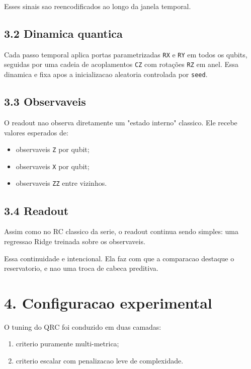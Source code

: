 \documentclass[12pt]{article}
\providecommand{\tightlist}{%
  \setlength{\itemsep}{0pt}\setlength{\parskip}{0pt}}
\begin{document}
Esses sinais sao reencodificados ao longo da janela temporal.

\subsection{3.2 Dinamica quantica}\label{32-dinamica-quantica}

Cada passo temporal aplica portas parametrizadas \texttt{RX} e \texttt{RY} em todos os qubits, seguidas por uma cadeia de acoplamentos \texttt{CZ} com rotações \texttt{RZ} em anel. Essa dinamica e fixa apos a inicializacao aleatoria controlada por \texttt{seed}.

\subsection{3.3 Observaveis}\label{33-observaveis}

O readout nao observa diretamente um "estado interno" classico. Ele recebe valores esperados de:

\begin{itemize}
\tightlist
\item
  observaveis \texttt{Z} por qubit;
\item
  observaveis \texttt{X} por qubit;
\item
  observaveis \texttt{ZZ} entre vizinhos.
\end{itemize}

\subsection{3.4 Readout}\label{34-readout}

Assim como no RC classico da serie, o readout continua sendo simples: uma regressao Ridge treinada sobre os observaveis.

Essa continuidade e intencional. Ela faz com que a comparacao destaque o reservatorio, e nao uma troca de cabeca preditiva.

\section{4. Configuracao experimental}\label{4-configuracao-experimental}

O tuning do QRC foi conduzido em duas camadas:

\begin{enumerate}
\def\labelenumi{\arabic{enumi}.}
\tightlist
\item
  criterio puramente multi-metrica;
\item
  criterio escalar com penalizacao leve de complexidade.
\end{enumerate}
\end{document}

